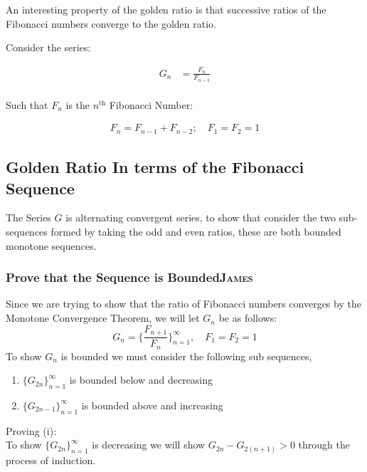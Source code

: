 \documentclass[a4paper,11pt,twoside]{article}
\begin{document}
An interesting property of the golden ratio is that successive ratios of the
Fibonacci numbers converge to the golden ratio.

Consider the series:

$$\begin{aligned}
G_n &= \frac{F_{n} }{F_{n - 1} } \\
\end{aligned}$$

Such that \(F_{n}\) is the \(n^{\mathrm{th}}\) Fibonacci Number:

$$\begin{aligned}
F_n = F_{n- 1} +  F_{n- 2} ; \quad F_1 = F_2 = 1
\end{aligned}$$

\subsection{Golden Ratio In terms of the Fibonacci Sequence}
\label{sec:org31e3985}
The Series \(G\) is alternating convergent series, to show that consider the two sub-sequences formed by taking the odd and even ratios, these are both bounded monotone sequences.
\subsubsection{Prove that the Sequence is Bounded\hfill{}\textsc{James}}
\label{sec:orgd821592}
Since we are trying to show that the ratio of Fibonacci numbers converges by the Monotone Convergence Theorem, we will let \(G_n\) be as follows:
\begin{equation*}
    G_n = \bigg\{ \frac{F_{n+1}}{F_n} \bigg\}_{n=1}^\infty, \quad F_1=F_2=1
\end{equation*}
To show \(G_n\) is bounded we must consider the following sub sequences,

\begin{enumerate}
\item \(\{G_{2n}\}_{n=1}^\infty\) is bounded below and decreasing
\item \(\{G_{2n-1}\}_{n=1}^\infty\) is bounded above and increasing
\end{enumerate}


Proving (i):\\

To show \(\{G_{2n}\}_{n=1}^\infty\) is decreasing we will show \(G_{2n} - G_{2(n+1)} > 0\) through the process of induction.
\end{document}
